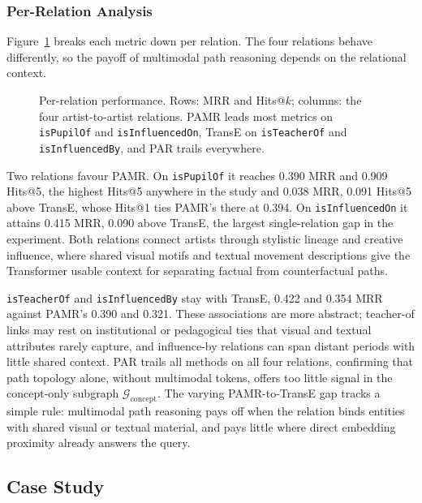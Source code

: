 \documentclass[runningheads]{llncs}
\begin{document}
\subsubsection{Per-Relation Analysis}

Figure~\ref{fig:per-relation} breaks each metric down per relation.
The four relations behave differently, so the payoff of multimodal
path reasoning depends on the relational context.

\begin{figure}[t]
  \centering
  
  \caption{Per-relation performance. Rows: MRR and Hits@$k$;
    columns: the four artist-to-artist relations. PAMR leads most
    metrics on \texttt{isPupilOf} and \texttt{isInfluencedOn},
    TransE on \texttt{isTeacherOf} and \texttt{isInfluencedBy}, and
    PAR trails everywhere.}
  \label{fig:per-relation}
\end{figure}

Two relations favour PAMR. On \texttt{isPupilOf} it reaches 0.390
MRR and 0.909 Hits@5, the highest Hits@5 anywhere in the study and
0.038 MRR, 0.091 Hits@5 above TransE, whose Hits@1 ties PAMR's
there at 0.394. On \texttt{isInfluencedOn} it
attains 0.415 MRR, 0.090 above TransE, the largest single-relation
gap in the experiment. Both relations connect artists through
stylistic lineage and creative influence, where shared visual motifs
and textual movement descriptions give the Transformer usable context
for separating factual from counterfactual paths.

\texttt{isTeacherOf} and \texttt{isInfluencedBy} stay with TransE,
0.422 and 0.354 MRR against PAMR's 0.390 and 0.321. These
associations are more abstract; teacher-of links may rest on
institutional or pedagogical ties that visual and textual attributes
rarely capture, and influence-by relations can span distant periods
with little shared context. PAR trails all methods on all four
relations, confirming that path topology alone, without multimodal
tokens, offers too little signal in the concept-only subgraph
$\mathcal{G}_{\text{concept}}$. The varying PAMR-to-TransE gap tracks
a simple rule: multimodal path reasoning pays off when the relation
binds entities with shared visual or textual material, and pays
little where direct embedding proximity already answers the query.

\subsection{Case Study}
\label{sec:case-study}
\end{document}
